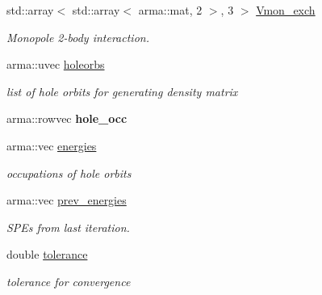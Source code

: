 \begin{DoxyCompactItemize}
\mbox{\label{classHartreeFock_a5ddc7c175c587f4cbf8a64b36c07e57d}} 
std\+::array$<$ std\+::array$<$ arma\+::mat, 2 $>$, 3 $>$ \hyperlink{classHartreeFock_a5ddc7c175c587f4cbf8a64b36c07e57d}{Vmon\+\_\+exch}
\begin{DoxyCompactList}\small\item\em Monopole 2-\/body interaction. \end{DoxyCompactList}\item 
\mbox{\label{classHartreeFock_a9700861effb1cb3739240b76ed519141}} 
arma\+::uvec \hyperlink{classHartreeFock_a9700861effb1cb3739240b76ed519141}{holeorbs}
\begin{DoxyCompactList}\small\item\em list of hole orbits for generating density matrix \end{DoxyCompactList}\item 
\mbox{\label{classHartreeFock_a0c11fc0a59ceaeeb415a0e6c8d85e604}} 
arma\+::rowvec {\bfseries hole\+\_\+occ}
\item 
arma\+::vec \hyperlink{classHartreeFock_a415fc1fbbba3a6a84d47e31ed18323c9}{energies}
\begin{DoxyCompactList}\small\item\em occupations of hole orbits \end{DoxyCompactList}\item 
\mbox{\label{classHartreeFock_a43e2a195ad044947a9e1fb9f3a937d8a}} 
arma\+::vec \hyperlink{classHartreeFock_a43e2a195ad044947a9e1fb9f3a937d8a}{prev\+\_\+energies}
\begin{DoxyCompactList}\small\item\em S\+PE\textquotesingle{}s from last iteration. \end{DoxyCompactList}\item 
\mbox{\label{classHartreeFock_a22c754579ad1a45f053a5305e87d4700}} 
double \hyperlink{classHartreeFock_a22c754579ad1a45f053a5305e87d4700}{tolerance}
\begin{DoxyCompactList}\small\item\em tolerance for convergence \end{DoxyCompactList}\item 
\mbox{\label{classHartreeFock_a16c9e1791919c2ceef5584bdc9b84a81}} 

\end{DoxyCompactItemize}
